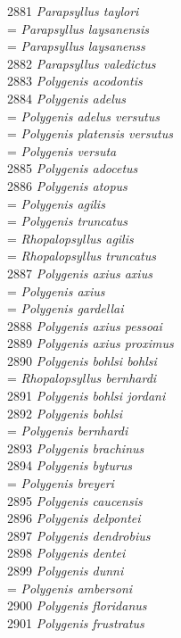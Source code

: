 \documentclass[
]{article}
\begin{document}
2881 \emph{Parapsyllus taylori}\\
= \emph{Parapsyllus laysanensis}\\
= \emph{Parapsyllus laysanenss}\\
2882 \emph{Parapsyllus valedictus}\\
2883 \emph{Polygenis acodontis}\\
2884 \emph{Polygenis adelus}\\
= \emph{Polygenis adelus versutus}\\
= \emph{Polygenis platensis versutus}\\
= \emph{Polygenis versuta}\\
2885 \emph{Polygenis adocetus}\\
2886 \emph{Polygenis atopus}\\
= \emph{Polygenis agilis}\\
= \emph{Polygenis truncatus}\\
= \emph{Rhopalopsyllus agilis}\\
= \emph{Rhopalopsyllus truncatus}\\
2887 \emph{Polygenis axius axius}\\
= \emph{Polygenis axius}\\
= \emph{Polygenis gardellai}\\
2888 \emph{Polygenis axius pessoai}\\
2889 \emph{Polygenis axius proximus}\\
2890 \emph{Polygenis bohlsi bohlsi}\\
= \emph{Rhopalopsyllus bernhardi}\\
2891 \emph{Polygenis bohlsi jordani}\\
2892 \emph{Polygenis bohlsi}\\
= \emph{Polygenis bernhardi}\\
2893 \emph{Polygenis brachinus}\\
2894 \emph{Polygenis byturus}\\
= \emph{Polygenis breyeri}\\
2895 \emph{Polygenis caucensis}\\
2896 \emph{Polygenis delpontei}\\
2897 \emph{Polygenis dendrobius}\\
2898 \emph{Polygenis dentei}\\
2899 \emph{Polygenis dunni}\\
= \emph{Polygenis ambersoni}\\
2900 \emph{Polygenis floridanus}\\
2901 \emph{Polygenis frustratus}\\
\end{document}
